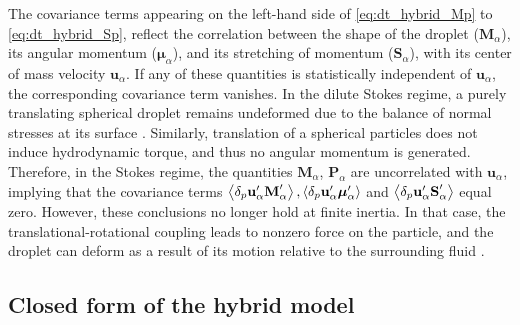 The covariance terms appearing on the left-hand side of  \ref{eq:dt_hybrid_Mp} to \ref{eq:dt_hybrid_Sp}, reflect the correlation between the shape of the droplet ($\textbf{M}_\alpha$), its angular momentum ($\bm\mu_\alpha$), and its stretching of momentum ($\textbf{S}_\alpha$), with its center of mass velocity $\textbf{u}_\alpha$. 
If any of these quantities is statistically independent of $\textbf{u}_\alpha$, the corresponding covariance term vanishes. 
In the dilute Stokes regime, a purely translating spherical droplet remains undeformed due to the balance of normal stresses at its surface \citep{leal2007advanced}. 
Similarly, translation of a spherical particles does not induce hydrodynamic torque, and thus no angular momentum is generated. 
Therefore, in the Stokes regime, the quantities  $\textbf{M}_\alpha$, $\textbf{P}_\alpha$ are uncorrelated with $\textbf{u}_\alpha$,  implying that the covariance terms $\left<\delta_{p} \textbf{u}_\alpha' \textbf{M}_\alpha'\right>,\left<\delta_{p} \textbf{u}_\alpha' \bm\mu_\alpha'\right>$ and $\left<\delta_{p} \textbf{u}_\alpha' \textbf{S}_\alpha'\right>$ equal zero. 
However, these conclusions no longer hold at finite inertia. 
In that case, the translational-rotational coupling \citep{rubinow1961transverse} leads to nonzero force on the particle, and the droplet can deform as a result of its motion relative to the surrounding fluid \citep{taylor1964deformation}. 





\subsection{Closed form of the hybrid model}


